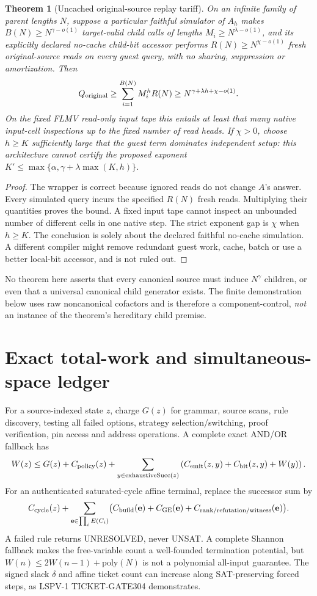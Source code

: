 \documentclass[11pt]{article}
\newtheorem{theorem}{Theorem}
\begin{document}
\begin{theorem}[Uncached original-source replay tariff]\label{thm:tariff}
On an infinite family of parent lengths $N$, suppose a particular faithful simulator of $A_h$ makes $B(N)\ge N^{\gamma-o(1)}$ target-valid child calls of lengths $M_i\ge N^{\lambda-o(1)}$, and its explicitly declared no-cache child-bit accessor performs $R(N)\ge N^{\chi-o(1)}$ \emph{fresh original-source reads on every guest query}, with no sharing, suppression or amortization. Then
\[
Q_{\rm original}\ge \sum_{i=1}^{B(N)} M_i^h R(N)
\ge N^{\gamma+\lambda h+\chi-o(1)}.
\]
On the fixed FLMV read-only input tape this entails at least that many native input-cell inspections up to the fixed number of read heads. If $\chi>0$, choose $h\ge K$ sufficiently large that the guest term dominates independent setup: this architecture cannot certify the proposed exponent $K'\le\max\{\alpha,\gamma+\lambda \max(K,h)\}$.
\end{theorem}
\begin{proof}
The wrapper is correct because ignored reads do not change $A$'s answer. Every simulated query incurs the specified $R(N)$ fresh reads. Multiplying their quantities proves the bound. A fixed input tape cannot inspect an unbounded number of different cells in one native step. The strict exponent gap is $\chi$ when $h\ge K$. The conclusion is solely about the declared faithful no-cache simulation. A different compiler might remove redundant guest work, cache, batch or use a better local-bit accessor, and is not ruled out.
\end{proof}
No theorem here asserts that every canonical source must induce $N^\gamma$ children, or even that a universal canonical child generator exists. The finite demonstration below uses raw noncanonical cofactors and is therefore a component-control, \emph{not} an instance of the theorem's hereditary child premise.

\section{Exact total-work and simultaneous-space ledger}
For a source-indexed state $z$, charge $G(z)$ for grammar, source scans, rule discovery, testing all failed options, strategy selection/switching, proof verification, pin access and address operations. A complete exact AND/OR fallback has
\[
W(z)\le G(z)+C_{\rm policy}(z)+
\sum_{y\in\mathrm{exhaustiveSucc}(z)}
 \left(C_{\rm emit}(z,y)+C_{\rm bit}(z,y)+W(y)\right).
\]
For an authenticated saturated-cycle affine terminal, replace the successor sum by
\[
C_{\rm cycle}(z)+
\sum_{\mathbf e\in\prod_i E(C_i)}
\bigl(C_{\rm build}(\mathbf e)+C_{\rm GE}(\mathbf e)+
C_{\rm rank/refutation/witness}(\mathbf e)\bigr).
\]
A failed rule returns UNRESOLVED, never UNSAT. A complete Shannon fallback makes the free-variable count a well-founded termination potential, but $W(n)\le2W(n-1)+\mathrm{poly}(N)$ is not a polynomial all-input guarantee. The signed slack $\delta$ and affine ticket count can increase along SAT-preserving forced steps, as LSPV-1 TICKET-GATE304 demonstrates.
\end{document}
